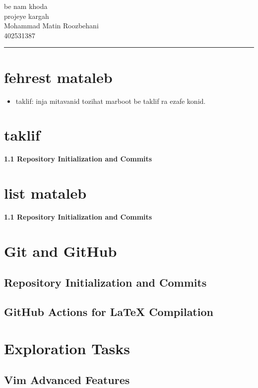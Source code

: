 \documentclass{article}
\begin{document}
\begin{center}
    {\Huge be nam khoda} \\[1cm]
    {\LARGE projeye kargah} \\[0.5cm]
    {\large Mohammad Matin Roozbehani} \\[0.5cm]
    {\large 402531387} \\[1cm]
    \rule{\linewidth}{0.4mm}
\end{center}

\vspace{1cm}

\section*{fehrest mataleb}
\begin{itemize}
    \item taklif: inja mitavanid tozihat marboot be taklif ra ezafe konid.
\end{itemize}

\newpage

\section*{taklif}
\textbf{1.1 Repository Initialization and Commits}

\section*{list mataleb}
\textbf{1.1 Repository Initialization and Commits}

\section{Git and GitHub}
\subsection{Repository Initialization and Commits}
\subsection{GitHub Actions for LaTeX Compilation}

\section{Exploration Tasks}
\subsection{Vim Advanced Features}
\end{document}
